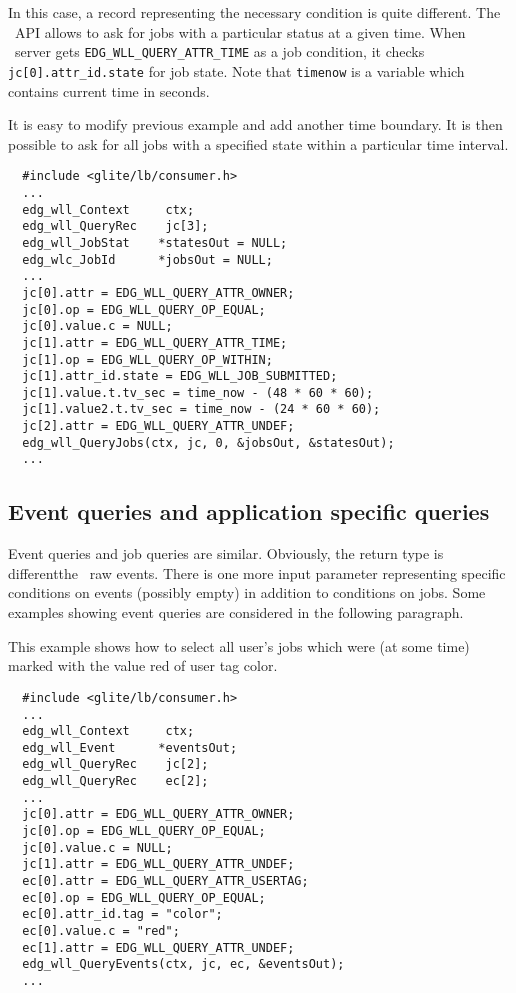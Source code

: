 In this case, a record representing the necessary condition is quite
different. The \LB\ API allows to ask for jobs with a particular status at a
given time. When \LB\ server gets \texttt{EDG\_WLL\_QUERY\_ATTR\_TIME}
as a job condition, it checks \texttt{jc[0].attr\_id.state} for job state. 
Note that \texttt{timenow} is a variable which contains current time in
seconds.

It is easy to modify previous example and add another time boundary. It is then 
possible to ask for all jobs with a specified state within a particular time
interval.
\begin{verbatim}
  #include <glite/lb/consumer.h>
  ...
  edg_wll_Context     ctx;    
  edg_wll_QueryRec    jc[3];
  edg_wll_JobStat    *statesOut = NULL;
  edg_wlc_JobId      *jobsOut = NULL;
  ...
  jc[0].attr = EDG_WLL_QUERY_ATTR_OWNER;
  jc[0].op = EDG_WLL_QUERY_OP_EQUAL;
  jc[0].value.c = NULL;
  jc[1].attr = EDG_WLL_QUERY_ATTR_TIME;
  jc[1].op = EDG_WLL_QUERY_OP_WITHIN;
  jc[1].attr_id.state = EDG_WLL_JOB_SUBMITTED;
  jc[1].value.t.tv_sec = time_now - (48 * 60 * 60);
  jc[1].value2.t.tv_sec = time_now - (24 * 60 * 60);
  jc[2].attr = EDG_WLL_QUERY_ATTR_UNDEF;
  edg_wll_QueryJobs(ctx, jc, 0, &jobsOut, &statesOut);
  ...
\end{verbatim}


\subsection{Event queries and application specific queries}
\label{ASQ}
Event queries and job queries are similar. 
Obviously, the return type is different\Dash the \LB\ raw events.
There is one more input parameter
representing specific conditions on events (possibly empty)
in addition to conditions on jobs.
Some examples showing event queries 
are considered in the following paragraph.


\label{ASQ_allred}
This example shows how to select all user's jobs which were (at some time)
marked with the value red of user tag color.
\begin{verbatim}
  #include <glite/lb/consumer.h>
  ...
  edg_wll_Context     ctx;    
  edg_wll_Event      *eventsOut;
  edg_wll_QueryRec    jc[2];
  edg_wll_QueryRec    ec[2];
  ...
  jc[0].attr = EDG_WLL_QUERY_ATTR_OWNER;
  jc[0].op = EDG_WLL_QUERY_OP_EQUAL;
  jc[0].value.c = NULL;
  jc[1].attr = EDG_WLL_QUERY_ATTR_UNDEF;
  ec[0].attr = EDG_WLL_QUERY_ATTR_USERTAG;
  ec[0].op = EDG_WLL_QUERY_OP_EQUAL;
  ec[0].attr_id.tag = "color";
  ec[0].value.c = "red";
  ec[1].attr = EDG_WLL_QUERY_ATTR_UNDEF;
  edg_wll_QueryEvents(ctx, jc, ec, &eventsOut);
  ...
\end{verbatim}

